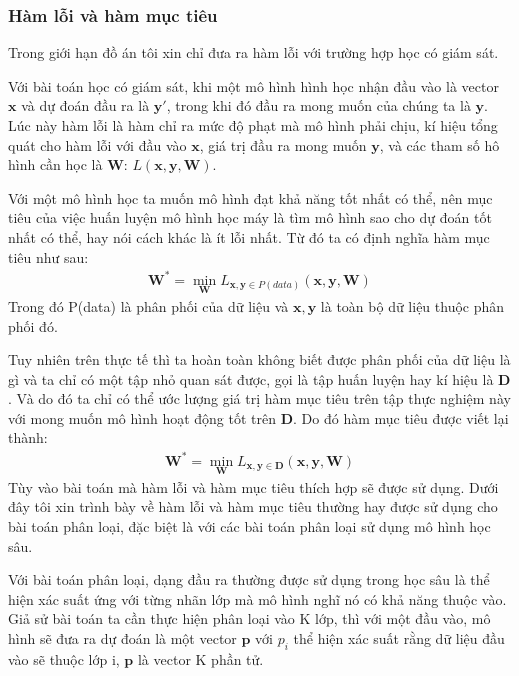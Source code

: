\documentclass[fontsize=12pt]{scrartcl}
\begin{document}
\subsubsection{Hàm lỗi và hàm mục tiêu}
Trong giới hạn đồ án tôi xin chỉ đưa ra hàm lỗi với trường hợp học có giám sát.
\par
Với bài toán học có giám sát, khi một mô hình hình học nhận đầu vào là vector $\boldsymbol{x}$ và dự đoán đầu ra là $\boldsymbol{y}'$, trong khi đó đầu ra mong muốn của chúng ta là $\boldsymbol{y}$. Lúc này hàm lỗi là hàm chỉ ra mức độ phạt mà mô hình phải chịu, kí hiệu tổng quát cho hàm lỗi với đầu vào $\boldsymbol{x}$, giá trị đầu ra mong muốn $\boldsymbol{y}$, và các tham số hô hình cần học là $\boldsymbol{W}$: $L(\boldsymbol{x}, \boldsymbol{y}, \boldsymbol{W})$.
\par
Với một mô hình học ta muốn mô hình đạt khả năng tốt nhất có thể, nên mục tiêu của việc huấn luyện mô hình học máy là tìm mô hình sao cho dự đoán tốt nhất có thể, hay nói cách khác là ít lỗi nhất. Từ đó ta có định nghĩa hàm mục tiêu như sau:
\begin{align}
\boldsymbol{W}^* = \displaystyle\min_{\boldsymbol{W}}L_{\boldsymbol{x}, \boldsymbol{y}\in P(data)}(\boldsymbol{x}, \boldsymbol{y}, \boldsymbol{W})
\end{align}
Trong đó P(data) là phân phối của dữ liệu và $\boldsymbol{x}, \boldsymbol{y}$ là toàn bộ dữ liệu thuộc phân phối đó.
\par
Tuy nhiên trên thực tế thì ta hoàn toàn không biết được phân phối của dữ liệu là gì và ta chỉ có một tập nhỏ quan sát được, gọi là tập huấn luyện hay kí hiệu là $\boldsymbol{D}$. Và do đó ta chỉ có thể ước lượng giá trị hàm mục tiêu trên tập thực nghiệm này với mong muốn mô hình hoạt động tốt trên $\boldsymbol{D}$. Do đó hàm mục tiêu được viết lại thành:
\begin{align}
\boldsymbol{W}^* = \displaystyle\min_{\boldsymbol{W}}L_{\boldsymbol{x}, \boldsymbol{y}\in \boldsymbol{D}}(\boldsymbol{x}, \boldsymbol{y}, \boldsymbol{W})
\end{align}
Tùy vào bài toán mà hàm lỗi và hàm mục tiêu thích hợp sẽ được sử dụng. Dưới đây tôi xin trình bày về hàm lỗi và hàm mục tiêu thường hay được sử dụng cho bài toán phân loại, đặc biệt là với các bài toán phân loại sử dụng mô hình học sâu.
\par
Với bài toán phân loại, dạng đầu ra thường được sử dụng trong học sâu là thể hiện xác suất ứng với từng nhãn lớp mà mô hình nghĩ nó có khả năng thuộc vào. Giả sử bài toán ta cần thực hiện phân loại vào K lớp, thì với một đầu vào, mô hình sẽ đưa ra dự đoán là một vector $\boldsymbol{p}$ với $p_i$ thể hiện xác suất rằng dữ liệu đầu vào sẽ thuộc lớp i, $\boldsymbol{p}$ là vector K phần tử.
\end{document}
